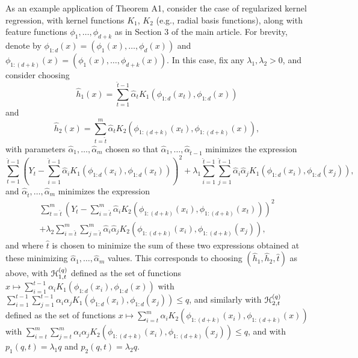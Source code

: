 \documentclass{article}
\newcommand{\pen}[0]{p}
\begin{document}
As an example application of Theorem A1, consider the case of regularized kernel regression, with kernel functions $K_{1}$, $K_{2}$ (e.g., radial basis functions),
along with feature functions $\phi_{1},\ldots,\phi_{d+k}$ as in Section 3 of the main article.  For brevity, denote by $\phi_{1:d}(x) = (\phi_{1}(x),\ldots,\phi_{d}(x))$ and $\phi_{1:(d+k)}(x) = (\phi_{1}(x),\ldots,\phi_{d+k}(x))$.
In this case, fix any $\lambda_{1},\lambda_{2} > 0$, and consider choosing 
\begin{equation*}
\hat{h}_{1}(x) = \sum_{t=1}^{\hat{t}-1} \hat{\alpha}_{t} K_{1}( \phi_{1:d}(x_{t}), \phi_{1:d}(x) )
\end{equation*}
and 
\begin{equation*}
\hat{h}_{2}(x) = \sum_{t=\hat{t}}^{m} \hat{\alpha}_{t} K_{2}( \phi_{1:(d+k)}(x_{t}), \phi_{1:(d+k)}(x) ),
\end{equation*}
with parameters $\hat{\alpha}_{1},\ldots,\hat{\alpha}_{m}$
chosen so that $\hat{\alpha}_{1},\ldots,\hat{\alpha}_{\hat{t}-1}$ minimizes the expression
\begin{equation*}
\sum_{t=1}^{\hat{t}-1} \left( Y_{t} - \sum_{i=1}^{\hat{t}-1} \hat{\alpha}_{i} K_{1}(\phi_{1:d}(x_{i}),\phi_{1:d}(x_{t})) \right)^{2} \!\!+ \lambda_{1} \sum_{i=1}^{\hat{t}-1} \sum_{j=1}^{\hat{t}-1} \hat{\alpha}_{i} \hat{\alpha}_{j} K_{1}(\phi_{1:d}(x_{i}),\phi_{1:d}(x_{j})),
\end{equation*}
and $\hat{\alpha}_{\hat{t}},\ldots,\hat{\alpha}_{m}$ minimizes the expression
\begin{multline*}
\sum_{t=\hat{t}}^{m} \left( Y_{t} - \sum_{i=\hat{t}}^{m} \hat{\alpha}_{i} K_{2}(\phi_{1:(d+k)}(x_{i}),\phi_{1:(d+k)}(x_{t})) \right)^{2} 
\\ + \lambda_{2} \sum_{i=\hat{t}}^{m} \sum_{j=\hat{t}}^{m} \hat{\alpha}_{i} \hat{\alpha}_{j} K_{2}(\phi_{1:(d+k)}(x_{i}),\phi_{1:(d+k)}(x_{j})),
\end{multline*}
and where $\hat{t}$ is chosen to minimize the sum of these two expressions obtained at these minimizing $\hat{\alpha}_{1},\ldots,\hat{\alpha}_{m}$ values.
This corresponds to choosing $(\hat{h}_{1},\hat{h}_{2},\hat{t})$ as above, with 
$\mathcal H_{1,t}^{(q)}$ defined as the set of functions 
$x \mapsto \sum_{i=1}^{t-1} \alpha_{i} K_{1}(\phi_{1:d}(x_{i}),\phi_{1:d}(x))$ with $\sum_{i=1}^{t-1} \sum_{j=1}^{t-1} \alpha_{i} \alpha_{j} K_{1}(\phi_{1:d}(x_{i}),\phi_{1:d}(x_{j})) \leq q$,
and similarly with $\mathcal H_{2,t}^{(q)}$ defined as the set of functions $x \mapsto \sum_{i=t}^{m} \alpha_{i} K_{2}(\phi_{1:(d+k)}(x_{i}),\phi_{1:(d+k)}(x))$ with $\sum_{i=t}^{m} \sum_{j=t}^{m} \alpha_{i} \alpha_{j} K_{2}(\phi_{1:(d+k)}(x_{i}),\phi_{1:(d+k)}(x_{j})) \leq q$,
and with $\pen_{1}(q,t) = \lambda_{1} q$ and $\pen_{2}(q,t) = \lambda_{2} q$.
\end{document}
